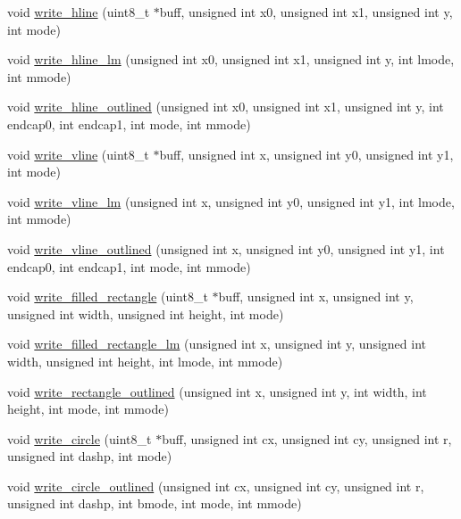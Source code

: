\begin{DoxyCompactItemize}
\item 
void \hyperlink{group___o_s_d_g_e_n_module_ga1918951dd8566c5eef5ecfd7dcd7c685}{write\-\_\-hline} (uint8\-\_\-t $\ast$buff, unsigned int x0, unsigned int x1, unsigned int y, int mode)
\item 
void \hyperlink{group___o_s_d_g_e_n_module_gacf5cb2507be8b860675b466d19fa4aa8}{write\-\_\-hline\-\_\-lm} (unsigned int x0, unsigned int x1, unsigned int y, int lmode, int mmode)
\item 
void \hyperlink{group___o_s_d_g_e_n_module_ga093e7b26837226a19a69ea698d6db954}{write\-\_\-hline\-\_\-outlined} (unsigned int x0, unsigned int x1, unsigned int y, int endcap0, int endcap1, int mode, int mmode)
\item 
void \hyperlink{group___o_s_d_g_e_n_module_ga34c98ce736d5146c81ef3b167780031f}{write\-\_\-vline} (uint8\-\_\-t $\ast$buff, unsigned int x, unsigned int y0, unsigned int y1, int mode)
\item 
void \hyperlink{group___o_s_d_g_e_n_module_ga4ab8daa08074c7ccb69b2f8a1d834979}{write\-\_\-vline\-\_\-lm} (unsigned int x, unsigned int y0, unsigned int y1, int lmode, int mmode)
\item 
void \hyperlink{group___o_s_d_g_e_n_module_ga0587de2636d0acd501858f056b6ad4da}{write\-\_\-vline\-\_\-outlined} (unsigned int x, unsigned int y0, unsigned int y1, int endcap0, int endcap1, int mode, int mmode)
\item 
void \hyperlink{group___o_s_d_g_e_n_module_ga66c619079158f1694d8cc86f109ba91e}{write\-\_\-filled\-\_\-rectangle} (uint8\-\_\-t $\ast$buff, unsigned int x, unsigned int y, unsigned int width, unsigned int height, int mode)
\item 
void \hyperlink{group___o_s_d_g_e_n_module_gafdf87d4c22a0fcb603bdfba416768248}{write\-\_\-filled\-\_\-rectangle\-\_\-lm} (unsigned int x, unsigned int y, unsigned int width, unsigned int height, int lmode, int mmode)
\item 
void \hyperlink{group___o_s_d_g_e_n_module_ga761aea940799fbd6d4f6bafe83ea2032}{write\-\_\-rectangle\-\_\-outlined} (unsigned int x, unsigned int y, int width, int height, int mode, int mmode)
\item 
void \hyperlink{group___o_s_d_g_e_n_module_ga634e8149f811d4bb090d50b25064907c}{write\-\_\-circle} (uint8\-\_\-t $\ast$buff, unsigned int cx, unsigned int cy, unsigned int r, unsigned int dashp, int mode)
\item 
void \hyperlink{group___o_s_d_g_e_n_module_gaa58af239ed159652cb196f745c79d9a6}{write\-\_\-circle\-\_\-outlined} (unsigned int cx, unsigned int cy, unsigned int r, unsigned int dashp, int bmode, int mode, int mmode)

\end{DoxyCompactItemize}
